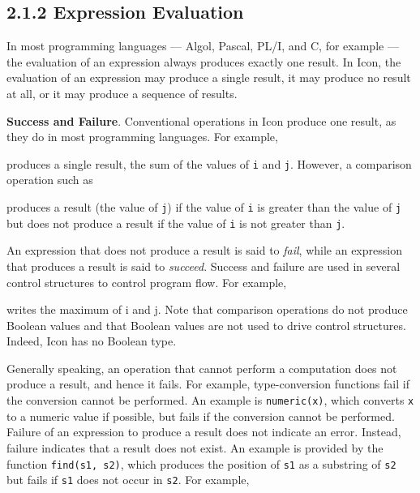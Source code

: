 \subsection[2.1.2 Expression Evaluation]{2.1.2 Expression Evaluation}

In most programming languages --- Algol, Pascal, PL/I, and C, for
example --- the evaluation of an expression always produces exactly
one result. In Icon, the evaluation of an expression may produce a
single result, it may produce no result at all, or it may produce a
sequence of results.

\textbf{Success and Failure}. Conventional operations in Icon
produce one result, as they do in most programming languages. For
example,


\noindent produces a single result, the sum of the values of \texttt{i} and
\texttt{j}. However, a comparison operation such as


\noindent produces a result (the value of \texttt{j}) if the value of
\texttt{i} is greater than the value of \texttt{j} but does not produce
a result if the value of \texttt{i} is not greater than \texttt{j}.

An expression that does not produce a result is said to \textit{fail},
while an expression that produces a result is said to
\textit{succeed}. Success and failure are used in several control
structures to control program flow. For example,


\noindent writes the maximum of i and j. Note that comparison
operations do not produce Boolean values and that Boolean values are
not used to drive control structures. Indeed, Icon has no Boolean
type.

Generally speaking, an operation that cannot perform a computation
does not produce a result, and hence it fails. For example,
type-conversion functions fail if the conversion cannot be
performed. An example is \texttt{numeric(x)}, which converts
\texttt{x} to a numeric value if possible, but fails if the conversion
cannot be performed. Failure of an expression to produce a result does
not indicate an error. Instead, failure indicates that a result does
not exist. An example is provided by the function \texttt{find(s1, s2)},
which produces the position of \texttt{s1} as a substring of \texttt{s2}
but fails if \texttt{s1} does not occur in \texttt{s2}.  For example,

